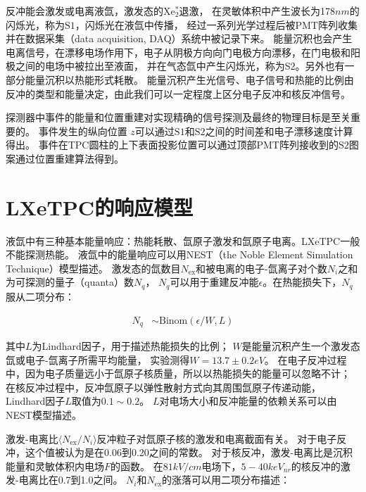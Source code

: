 反冲能会激发或电离液氙，激发态的$\mathrm{Xe_2^*}$退激，
在灵敏体积中产生波长为178$\si{nm}$的闪烁光，称为$\mathrm{S1}$，闪烁光在液氙中传播，
经过一系列光学过程后被PMT阵列收集并在数据采集（data acquisition, DAQ）系统中被记录下来。
能量沉积也会产生电离信号，在漂移电场作用下，电子从阴极方向向门电极方向漂移，在门电极和阳极之间的电场中被拉出至液面，
并在气态氙中产生闪烁光，称为$\mathrm{S2}$。另外也有一部分能量沉积以热能形式耗散。
能量沉积产生光信号、电子信号和热能的比例由反冲的类型和能量决定，由此我们可以一定程度上区分电子反冲和核反冲信号。

探测器中事件的能量和位置重建对实现精确的信号探测及最终的物理目标是至关重要的。
事件发生的纵向位置 $z$可以通过$\mathrm{S1}$和$\mathrm{S2}$之间的时间差和电子漂移速度计算得出。
事件在TPC圆柱的上下表面投影位置可以通过顶部PMT阵列接收到的$\mathrm{S2}$图案通过位置重建算法得到。

\section{LXeTPC的响应模型}

液氙中有三种基本能量响应：热能耗散、氙原子激发和氙原子电离。LXeTPC一般不能探测热能。
液氙中的能量响应可以用NEST（the Noble Element Simulation Technique）模型描述\cite{szydagis_nest_2011,lenardo_global_2015}。
激发态的氙数目$N_{\mathrm{ex}}$和被电离的电子-氙离子对个数$N_i$之和为可探测的量子（quanta）数$N_q$，
$N_q$可以用于重建反冲能$\epsilon$。在热能损失下，$N_q$服从二项分布：

\begin{align}
    \label{eq:N_q}
    N_q &\sim \mathrm{Binom}\left(\epsilon/W,L\right)
\end{align}

其中$L$为Lindhard因子，用于描述热能损失的比例；
$W$是能量沉积产生一个激发态氙或电子-氙离子所需平均能量，
实验测得$W=13.7\pm0.2\si{eV}$\cite{szydagis_nest_2011}。
在电子反冲过程中，因为电子质量远小于氙原子核质量，所以以热能损失的能量可以忽略不计；
在核反冲过程中，反冲氙原子以弹性散射方式向其周围氙原子传递动能，Lindhard因子$L$取值为$0.1\sim0.2$。
$L$对电场大小和反冲能量的依赖关系可以由NEST模型描述。

激发-电离比$\langle N_{\mathrm{ex}}/N_i\rangle$反冲粒子对氙原子核的激发和电离截面有关。
对于电子反冲，这个值被认为是在0.06到0.20之间的常数。
对于核反冲，激发-电离比是沉积能量和灵敏体积内电场$F$的函数\cite{lenardo_global_2015}。
在$81\si{kV/cm}$电场下，$5-40\si{keV_{nr}}$的核反冲的激发-电离比在0.7到1.0之间。
$N_i$和$N_{\mathrm{ex}}$的涨落可以用二项分布描述：

